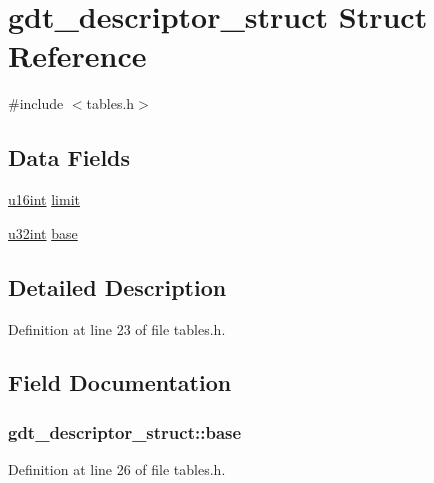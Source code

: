 \hypertarget{structgdt__descriptor__struct}{}\section{gdt\+\_\+descriptor\+\_\+struct Struct Reference}
\label{structgdt__descriptor__struct}


{\ttfamily \#include $<$tables.\+h$>$}

\subsection*{Data Fields}
\begin{DoxyCompactItemize}
\item 
\hyperlink{system_8h_a863d9497073aad2b991aeab2211d87af}{u16int} \hyperlink{structgdt__descriptor__struct_a3c8ae013805dd982b25f0d62e3cdee0e}{limit}
\item 
\hyperlink{system_8h_a757de76cafbcddaac0d1632902fe4cb8}{u32int} \hyperlink{structgdt__descriptor__struct_aa47407e7b435c214d0cdd22cb66f0e71}{base}
\end{DoxyCompactItemize}


\subsection{Detailed Description}


Definition at line 23 of file tables.\+h.



\subsection{Field Documentation}
\subsubsection[{\texorpdfstring{base}{base}}]{ gdt\+\_\+descriptor\+\_\+struct\+::base}\hypertarget{structgdt__descriptor__struct_aa47407e7b435c214d0cdd22cb66f0e71}{}\label{structgdt__descriptor__struct_aa47407e7b435c214d0cdd22cb66f0e71}


Definition at line 26 of file tables.\+h.

